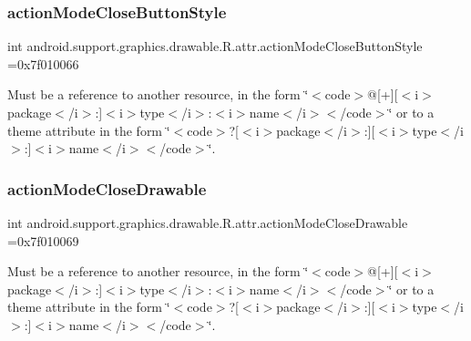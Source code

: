 \subsubsection{\texorpdfstring{action\+Mode\+Close\+Button\+Style}{actionModeCloseButtonStyle}}
{\footnotesize\ttfamily int android.\+support.\+graphics.\+drawable.\+R.\+attr.\+action\+Mode\+Close\+Button\+Style =0x7f010066\hspace{0.3cm}{\ttfamily [static]}}

Must be a reference to another resource, in the form \char`\"{}$<$code$>$@\mbox{[}+\mbox{]}\mbox{[}$<$i$>$package$<$/i$>$\+:\mbox{]}$<$i$>$type$<$/i$>$\+:$<$i$>$name$<$/i$>$$<$/code$>$\char`\"{} or to a theme attribute in the form \char`\"{}$<$code$>$?\mbox{[}$<$i$>$package$<$/i$>$\+:\mbox{]}\mbox{[}$<$i$>$type$<$/i$>$\+:\mbox{]}$<$i$>$name$<$/i$>$$<$/code$>$\char`\"{}. \mbox{\label{classandroid_1_1support_1_1graphics_1_1drawable_1_1R_1_1attr_af3213490a98c46d69bae80ae86ff2740}} 
\subsubsection{\texorpdfstring{action\+Mode\+Close\+Drawable}{actionModeCloseDrawable}}
{\footnotesize\ttfamily int android.\+support.\+graphics.\+drawable.\+R.\+attr.\+action\+Mode\+Close\+Drawable =0x7f010069\hspace{0.3cm}{\ttfamily [static]}}

Must be a reference to another resource, in the form \char`\"{}$<$code$>$@\mbox{[}+\mbox{]}\mbox{[}$<$i$>$package$<$/i$>$\+:\mbox{]}$<$i$>$type$<$/i$>$\+:$<$i$>$name$<$/i$>$$<$/code$>$\char`\"{} or to a theme attribute in the form \char`\"{}$<$code$>$?\mbox{[}$<$i$>$package$<$/i$>$\+:\mbox{]}\mbox{[}$<$i$>$type$<$/i$>$\+:\mbox{]}$<$i$>$name$<$/i$>$$<$/code$>$\char`\"{}. \mbox{\label{classandroid_1_1support_1_1graphics_1_1drawable_1_1R_1_1attr_a5cd74420b54bc179b77692627f344bb7}} 
